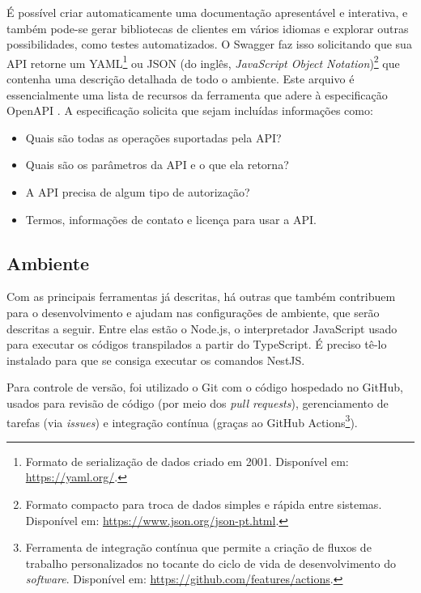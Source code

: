 É possível criar automaticamente uma documentação apresentável e interativa, e também pode-se gerar bibliotecas de clientes em vários idiomas e explorar outras possibilidades, como testes automatizados. O Swagger faz isso solicitando que sua API retorne um YAML\footnote{Formato de serialização de dados criado em 2001. Disponível em: \url{https://yaml.org/}.} ou JSON (do inglês, \textit{JavaScript Object Notation})\footnote{Formato compacto para troca de dados simples e rápida entre sistemas. Disponível em: \url{https://www.json.org/json-pt.html}.} que contenha uma descrição detalhada de todo o ambiente. Este arquivo é essencialmente uma lista de recursos da ferramenta que adere à especificação OpenAPI \cite{smartbear2020Swagger}. A especificação solicita que sejam incluídas informações como:

\begin{itemize}
    \item Quais são todas as operações suportadas pela API?
    \item Quais são os parâmetros da API e o que ela retorna?
    \item A API precisa de algum tipo de autorização?
    \item Termos, informações de contato e licença para usar a API.
\end{itemize}

\subsection{Ambiente}
\label{ssec:Ambiente}
Com as principais ferramentas já descritas, há outras que também contribuem para o desenvolvimento e ajudam nas configurações de ambiente, que serão descritas a seguir. Entre elas estão o Node.js, o interpretador JavaScript usado para executar os códigos transpilados a partir do TypeScript. É preciso tê-lo instalado para que se consiga executar os comandos NestJS.

Para controle de versão, foi utilizado o Git com o código hospedado no GitHub, usados para revisão de código (por meio dos \textit{pull requests}), gerenciamento de tarefas (via \textit{issues}) e integração contínua (graças ao GitHub Actions\footnote{Ferramenta de integração contínua que permite a criação de fluxos de trabalho personalizados no tocante do ciclo de vida de desenvolvimento do \textit{software}. Disponível em: \url{https://github.com/features/actions}.}).

